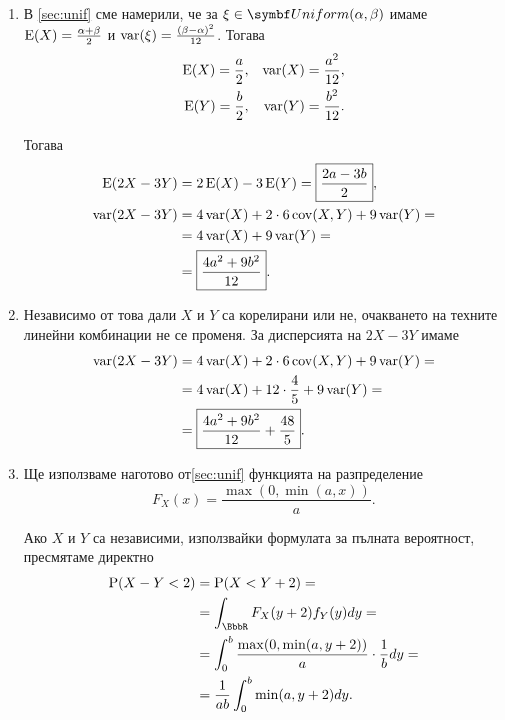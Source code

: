 \documentclass{../../common/topic}
\begin{document}
\begin{solution}
  \hfill
  \begin{enumerate}[label=\alph*)]
    \item В \cref{sec:unif} сме намерили, че за \( \xi \in \distr{Uniform}(\alpha, \beta) \) имаме \( \operatorname{E}(X) = \frac {\alpha + \beta} 2 \) и \( \operatorname{var}(\xi) = \frac {{(\beta - \alpha)}^2} {12} \). Тогава
    \begin{align*}
      \operatorname{E}(X) = \frac a 2,
      &&
      \operatorname{var}(X) = \frac {a^2} {12},
      \\
      \operatorname{E}(Y) = \frac b 2,
      &&
      \operatorname{var}(Y) = \frac {b^2} {12}.
    \end{align*}

    Тогава
    \begin{align*}
      \operatorname{E}(2X - 3Y)
      &=
      2\operatorname{E}(X) - 3\operatorname{E}(Y)
      =
      \boxed{\frac {2a - 3b} 2},
      \\
      \operatorname{var}(2X - 3Y)
      &=
      4\operatorname{var}(X) + 2 \cdot 6 \operatorname{cov}(X, Y) + 9\operatorname{var}(Y)
      = \\ &=
      4\operatorname{var}(X) + 9\operatorname{var}(Y)
      = \\ &=
      \boxed{\frac {4a^2 + 9b^2} {12}}.
    \end{align*}

    \item Независимо от това дали \( X \) и \( Y \) са корелирани или не, очакването на техните линейни комбинации не се променя. За дисперсията на \( 2X - 3Y \) имаме
    \begin{align*}
      \operatorname{var}(2X - 3Y)
      &=
      4\operatorname{var}(X) + 2 \cdot 6 \operatorname{cov}(X, Y) + 9\operatorname{var}(Y)
      = \\ &=
      4\operatorname{var}(X) + 12 \cdot \frac 4 5 + 9\operatorname{var}(Y)
      = \\ &=
      \boxed{\frac {4a^2 + 9b^2} {12} + \frac {48} 5}.
    \end{align*}

    \item Ще използваме наготово от\cref{sec:unif} функцията на разпределение
    \begin{equation*}
      F_X(x) = \frac {\max(0, \min(a, x))} a.
    \end{equation*}

     Ако \( X \) и \( Y \) са независими, използвайки формулата за пълната вероятност, пресмятаме директно
    \begin{align*}
      \Prob(X - Y < 2)
      &=
      \Prob(X < Y + 2)
      = \\ &=
      \int_{\BbbR} F_X(y+2) f_Y(y) dy
      = \\ &=
      \int_0^b \frac {\max(0, \min(a, y+2))} a \cdot \frac 1 b dy
      = \\ &=
      \frac 1 {ab} \int_0^b \min(a, y+2) dy.
    \end{align*}


\end{enumerate}
\end{solution}
\end{document}
